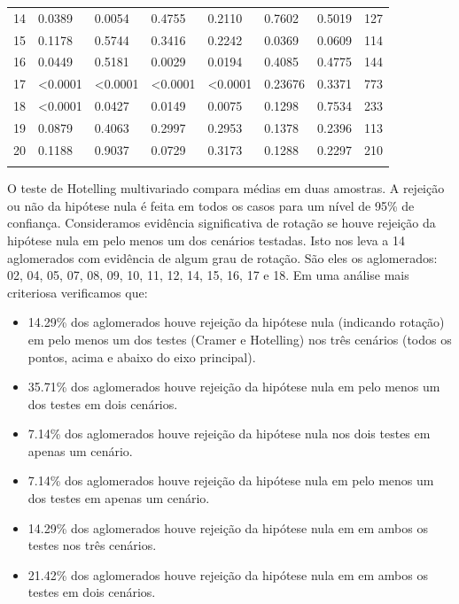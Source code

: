 \begin{table}[H]
{\begin{tabular}{llllllll}
14  &  {\color{red}0.0389} & {\color{red}0.0054} & 0.4755 &  0.2110 & 0.7602 & 0.5019 & 127 \\ 
15  &  0.1178 & 0.5744 &  0.3416 &  0.2242 & {\color{red}0.0369} & 0.0609 & 114 \\ 
16  &  {\color{red}0.0449} & 0.5181 & {\color{red}0.0029} &  {\color{red}0.0194} & 0.4085 & 0.4775 & 144  \\ 
17  &  {\color{red}<0.0001}  & {\color{red}<0.0001} & {\color{red}<0.0001} & {\color{red}<0.0001} & 0.23676 & 0.3371 & 773 \\ 
18  &  {\color{red}<0.0001} & {\color{red}0.0427} & {\color{red}0.0149} &  {\color{red}0.0075} & 0.1298 & 0.7534 & 233 \\ 
19  &  0.0879 & 0.4063 &  0.2997 &  0.2953 & 0.1378 & 0.2396 & 113 \\ 
20  &  0.1188 & 0.9037 &  0.0729 &  0.3173 & 0.1288 & 0.2297 & 210 \\ \hline
\label{tab:selec20T}
\end{tabular}
}
\end{table}

 O teste de Hotelling multivariado compara médias em duas amostras. A rejeição ou não da hipótese nula é feita em todos os casos para um nível de 95\% de confiança. Consideramos evidência significativa de rotação se houve rejeição da hipótese nula em pelo menos um dos cenários testadas. Isto nos leva a 14 aglomerados com evidência de algum grau de rotação. São eles os aglomerados: 02, 04, 05, 07, 08, 09, 10, 11, 12, 14, 15, 16, 17 e 18. Em uma análise mais criteriosa verificamos que:

\begin{itemize}
   	\item 14.29\% dos aglomerados houve rejeição da hipótese nula (indicando rotação) em pelo menos um dos testes (Cramer e Hotelling) nos três cenários (todos os pontos, acima e abaixo do eixo principal). 
   	\item 35.71\% dos aglomerados houve rejeição da hipótese nula em pelo menos um dos testes em dois cenários.
   	\item 7.14\% dos aglomerados houve rejeição da hipótese nula nos dois testes em apenas um cenário.
   	\item 7.14\% dos aglomerados houve rejeição da hipótese nula em pelo menos um dos testes em apenas um cenário.
   	\item 14.29\% dos aglomerados houve rejeição da hipótese nula em em ambos os testes nos três cenários.
   	\item 21.42\% dos aglomerados houve rejeição da hipótese nula em em ambos os testes em dois cenários.
 \end{itemize} 

